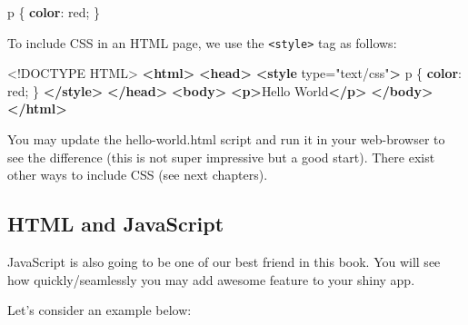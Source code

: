 \documentclass[]{book}
\newenvironment{Shaded}{\begin{snugshade}}{\end{snugshade}}
\newcommand{\DataTypeTok}[1]{\textcolor[rgb]{0.13,0.29,0.53}{#1}}
\newcommand{\DecValTok}[1]{\textcolor[rgb]{0.00,0.00,0.81}{#1}}
\newcommand{\KeywordTok}[1]{\textcolor[rgb]{0.13,0.29,0.53}{\textbf{#1}}}
\newcommand{\NormalTok}[1]{#1}
\newcommand{\OtherTok}[1]{\textcolor[rgb]{0.56,0.35,0.01}{#1}}
\newcommand{\StringTok}[1]{\textcolor[rgb]{0.31,0.60,0.02}{#1}}
\begin{document}
\begin{Shaded}
\begin{Highlighting}[]
\NormalTok{p \{}
  \KeywordTok{color}\NormalTok{: }\DecValTok{red}\NormalTok{;}
\NormalTok{\}}
\end{Highlighting}
\end{Shaded}

To include CSS in an HTML page, we use the \texttt{\textless{}style\textgreater{}} tag as follows:

\begin{Shaded}
\begin{Highlighting}[]
\DataTypeTok{<!DOCTYPE }\NormalTok{HTML}\DataTypeTok{>}
\KeywordTok{<html>}
  \KeywordTok{<head>}
    \KeywordTok{<style}\OtherTok{ type=}\StringTok{"text/css"}\KeywordTok{>}
\NormalTok{      p \{}
        \KeywordTok{color}\NormalTok{: }\DecValTok{red}\NormalTok{;}
\NormalTok{      \}}
    \KeywordTok{</style>}
  \KeywordTok{</head>}
  \KeywordTok{<body>}
  \KeywordTok{<p>}\NormalTok{Hello World}\KeywordTok{</p>}
  \KeywordTok{</body>}
\KeywordTok{</html>}
\end{Highlighting}
\end{Shaded}

You may update the hello-world.html script and run it in your web-browser to see the difference (this is not super impressive but a good start). There exist other ways to include CSS (see next chapters).

\hypertarget{html-and-javascript}{%
\subsection{HTML and JavaScript}\label{html-and-javascript}}

JavaScript is also going to be one of our best friend in this book.
You will see how quickly/seamlessly you may add awesome feature to your shiny app.

Let's consider an example below:
\end{document}
